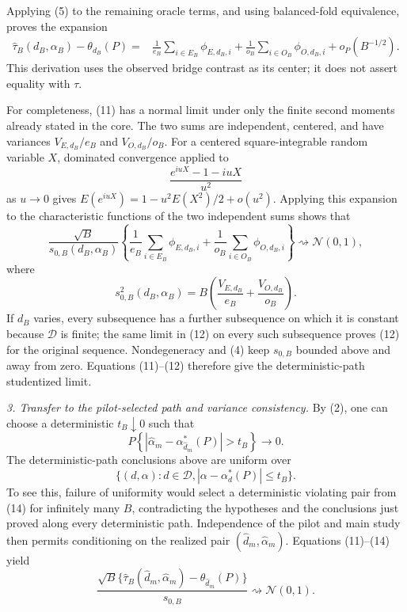 Applying (5) to the remaining oracle terms, and using balanced-fold equivalence, proves the expansion
\[
\begin{aligned}
 \widehat\tau_B(d_B,\alpha_B)-\theta_{d_B}(P)
 ={}&\frac1{e_B}\sum_{i\in E_B}\phi_{E,d_B,i}
 +\frac1{o_B}\sum_{i\in O_B}\phi_{O,d_B,i}
 +o_P(B^{-1/2}).
\end{aligned}
 \tag{11}
\]
This derivation uses the observed bridge contrast as its center; it does not assert equality with \(\tau\).

For completeness, (11) has a normal limit under only the finite second moments already stated in the core.  The two sums are independent, centered, and have variances \(V_{E,d_B}/e_B\) and \(V_{O,d_B}/o_B\).  For a centered square-integrable random variable \(X\), dominated convergence applied to
\[
 \frac{e^{iuX}-1-iuX}{u^2}
\]
as \(u\to0\) gives \(E(e^{iuX})=1-u^2E(X^2)/2+o(u^2)\).  Applying this expansion to the characteristic functions of the two independent sums shows that
\[
 \frac{\sqrt B}{s_{0,B}(d_B,\alpha_B)}
 \left\{
 \frac1{e_B}\sum_{i\in E_B}\phi_{E,d_B,i}
 +\frac1{o_B}\sum_{i\in O_B}\phi_{O,d_B,i}
 \right\}
 \rightsquigarrow\mathcal N(0,1),
 \tag{12}
\]
where
\[
 s_{0,B}^2(d_B,\alpha_B)
 =B\left(\frac{V_{E,d_B}}{e_B}+\frac{V_{O,d_B}}{o_B}\right).
\]
If \(d_B\) varies, every subsequence has a further subsequence on which it is constant because \(\mathcal D\) is finite; the same limit in (12) on every such subsequence proves (12) for the original sequence.  Nondegeneracy and (4) keep \(s_{0,B}\) bounded above and away from zero.  Equations (11)--(12) therefore give the deterministic-path studentized limit.

\emph{3. Transfer to the pilot-selected path and variance consistency.}
By (2), one can choose a deterministic \(t_B\downarrow0\) such that
\[
 P\left\{
 |\widehat\alpha_m-\alpha_{\widehat d_m}^*(P)|>t_B
 \right\}\longrightarrow0.
 \tag{13}
\]
The deterministic-path conclusions above are uniform over
\[
 \{(d,\alpha):d\in\mathcal D,
 |\alpha-\alpha_d^*(P)|\le t_B\}.
 \tag{14}
\]
To see this, failure of uniformity would select a deterministic violating pair from (14) for infinitely many \(B\), contradicting the hypotheses and the conclusions just proved along every deterministic path.  Independence of the pilot and main study then permits conditioning on the realized pair \((\widehat d_m,\widehat\alpha_m)\).  Equations (11)--(14) yield
\[
 \frac{\sqrt B\{\widehat\tau_B(\widehat d_m,\widehat\alpha_m)
 -\theta_{\widehat d_m}(P)\}}{s_{0,B}}
 \rightsquigarrow\mathcal N(0,1).
 \tag{15}
\]

